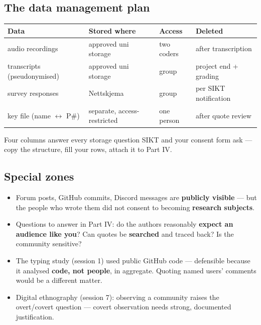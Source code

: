 \documentclass[11pt,a4paper,british,twoside=false,headings=small,chapterprefix=false,numbers=noenddot]{scrbook}
\begin{document}
\subsection{The data management plan}
\begin{center}\small
\footnotesize
  \renewcommand{\arraystretch}{1.35}
  \begin{tabular}{@{}p{3.0cm}p{3.3cm}p{3.2cm}p{3.2cm}@{}}
    \toprule
    \textbf{Data} & \textbf{Stored where} & \textbf{Access} & \textbf{Deleted}\\
    \midrule
    audio recordings & approved uni storage & two coders & after transcription\\
    transcripts (pseudonymised) & approved uni storage & group & project end + grading\\
    survey responses & Nettskjema & group & per SIKT notification\\
    key file (name $\leftrightarrow$ P\#) & separate, access-restricted & one person & after quote review\\
    \bottomrule
  \end{tabular}
  

  Four columns answer every storage question SIKT and your consent form ask
  --- copy the structure, fill your rows, attach it to Part IV.
\end{center}


\subsection{Special zones}
\begin{center}\small
\begin{itemize}\setlength{\itemsep}{0.45em}
    \item Forum posts, GitHub commits, Discord messages are \textbf{publicly
          visible} --- but the people who wrote them did not consent to
          becoming \textbf{research subjects}.
    \item Questions to answer in Part IV: do the authors reasonably
          \textbf{expect an audience like you}? Can quotes be
          \textbf{searched} and traced back? Is the community sensitive?
    \item The typing study (session 1) used public GitHub code --- defensible
          because it analysed \textbf{code, not people}, in aggregate.
          Quoting named users' comments would be a different matter.
    \item Digital ethnography (session 7): observing a community raises the
          overt/covert question --- covert observation needs strong,
          documented justification.
  \end{itemize}
\end{center}
\end{document}
